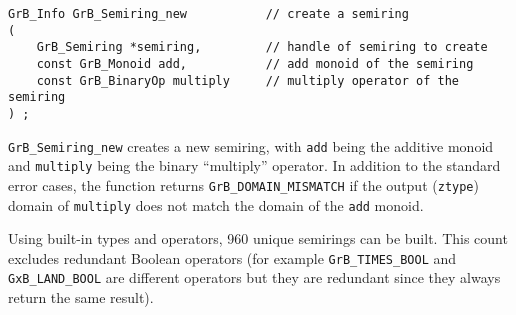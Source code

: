 \documentclass[12pt]{article}
\begin{document}
\begin{mdframed}[userdefinedwidth=6in]
{\footnotesize
\begin{verbatim}
GrB_Info GrB_Semiring_new           // create a semiring
(
    GrB_Semiring *semiring,         // handle of semiring to create
    const GrB_Monoid add,           // add monoid of the semiring
    const GrB_BinaryOp multiply     // multiply operator of the semiring
) ;
\end{verbatim}
} \end{mdframed}

\verb'GrB_Semiring_new' creates a new semiring, with \verb'add' being the
additive monoid and \verb'multiply' being the binary ``multiply'' operator.  In
addition to the standard error cases, the function returns
\verb'GrB_DOMAIN_MISMATCH' if the output (\verb'ztype') domain of
\verb'multiply' does not match the domain of the \verb'add' monoid.

Using built-in types and operators, 960 unique semirings can be built.  This
count excludes redundant Boolean operators (for example \verb'GrB_TIMES_BOOL'
and \verb'GxB_LAND_BOOL' are different operators but they are redundant since
they always return the same result).
\end{document}
